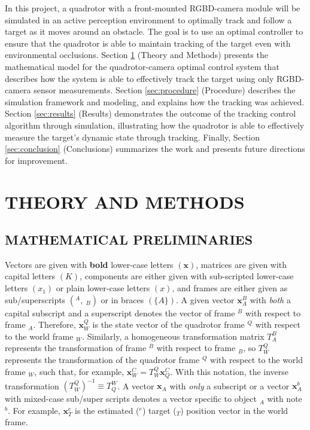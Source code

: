\documentclass[11pt]{article}
\begin{document}
In this project, a quadrotor with a front-mounted RGBD-camera module will be simulated in an active perception environment to optimally track and follow a target as it moves around an obstacle. The goal is to use an optimal controller to ensure that the quadrotor is able to maintain tracking of the target even with environmental occlusions. Section \ref{sec:theory} (Theory and Methods) presents the mathematical model for the quadrotor-camera optimal control system that describes how the system is able to effectively track the target using only RGBD-camera sensor measurements. Section \ref{sec:procedure} (Procedure) describes the simulation framework and modeling, and explains how the tracking was achieved. Section \ref{sec:results} (Results) demonstrates the outcome of the tracking control algorithm through simulation, illustrating how the quadrotor is able to effectively measure the target's dynamic state through tracking. Finally, Section \ref{sec:conclusion} (Conclusions) summarizes the work and presents future directions for improvement.

\section{THEORY AND METHODS}\label{sec:theory}

\subsection{MATHEMATICAL PRELIMINARIES}
Vectors are given with \textbf{bold} lower-case letters $(\mathbf x)$, matrices are given with capital letters $(K)$, components are either given with sub-scripted lower-case letters $(x_1)$ or plain lower-case letters $(x)$, and frames are either given as sub/superscripts $({}^A,\ {}_B)$ or in braces $(\{A\})$. A given vector $\mathbf x_A^B$ with \textit{both} a capital subscript and a superscript denotes the vector of frame ${}^B$ with respect to frame ${}_A$. Therefore, $\mathbf x_W^Q$ is the state vector of the quadrotor frame ${}^Q$ with respect to the world frame ${}_W$. Similarly, a homogeneous transformation matrix $T_A^B$ represents the transformation of frame ${}^B$ with respect to frame ${}_B$, so $T_W^Q$ represents the transformation of the quadrotor frame ${}^Q$ with respect to the world frame ${}_W$, such that, for example, $\mathbf x_W^C=T_W^Q\mathbf x_Q^C$. With this notation, the inverse transformation $(T_W^Q)^{-1}\equiv T_Q^W$. A vector $\mathbf x_A$ with \textit{only} a subscript or a vector $\mathbf x_A^b$ with mixed-case sub/super scripts denotes a vector specific to object ${}_A$ with note ${}^b$. For example, $\mathbf x_T^e$ is the estimated (${}^e$) target (${}_T$) position vector in the world frame.
\end{document}
